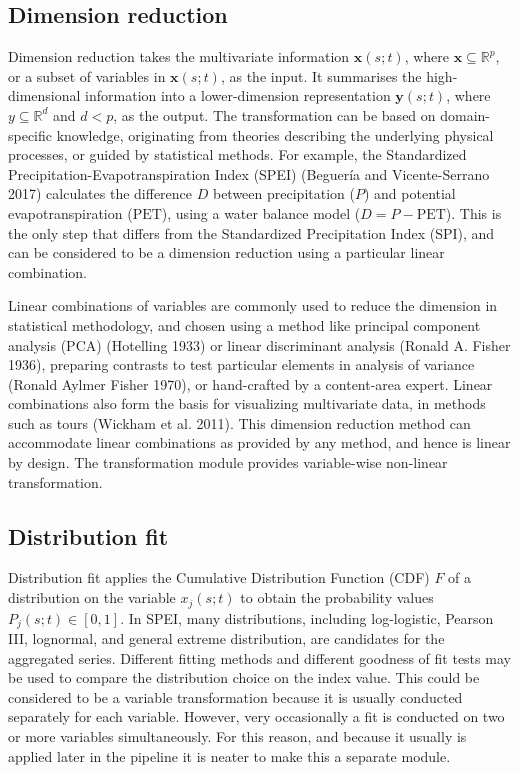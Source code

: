\documentclass[
]{interact}
\begin{document}
\hypertarget{dimension-reduction}{%
\subsection{Dimension reduction}\label{dimension-reduction}}

Dimension reduction takes the multivariate information
\(\mathbf{x}(s;t)\), where \(\mathbf{x} \subseteq \mathbb{R}^p\), or a
subset of variables in \(\mathbf{x}(s;t)\), as the input. It summarises
the high-dimensional information into a lower-dimension representation
\(\mathbf{y}(s;t)\), where \(y \subseteq \mathbb{R}^d\) and \(d < p\),
as the output. The transformation can be based on domain-specific
knowledge, originating from theories describing the underlying physical
processes, or guided by statistical methods. For example, the
Standardized Precipitation-Evapotranspiration Index (SPEI) (Beguería and
Vicente-Serrano 2017) calculates the difference \(D\) between
precipitation (\(P\)) and potential evapotranspiration (\(\text{PET}\)),
using a water balance model (\(D = P - \text{PET}\)). This is the only
step that differs from the Standardized Precipitation Index (SPI), and
can be considered to be a dimension reduction using a particular linear
combination.

Linear combinations of variables are commonly used to reduce the
dimension in statistical methodology, and chosen using a method like
principal component analysis (PCA) (Hotelling 1933) or linear
discriminant analysis (Ronald A. Fisher 1936), preparing contrasts to
test particular elements in analysis of variance (Ronald Aylmer Fisher
1970), or hand-crafted by a content-area expert. Linear combinations
also form the basis for visualizing multivariate data, in methods such
as tours (Wickham et al. 2011). This dimension reduction method can
accommodate linear combinations as provided by any method, and hence is
linear by design. The transformation module provides variable-wise
non-linear transformation.

\hypertarget{distribution-fit}{%
\subsection{Distribution fit}\label{distribution-fit}}

Distribution fit applies the Cumulative Distribution Function (CDF)
\(F\) of a distribution on the variable \(x_j(s; t)\) to obtain the
probability values \(P_j(s;t) \in [0, 1]\). In SPEI, many distributions,
including log-logistic, Pearson III, lognormal, and general extreme
distribution, are candidates for the aggregated series. Different
fitting methods and different goodness of fit tests may be used to
compare the distribution choice on the index value. This could be
considered to be a variable transformation because it is usually
conducted separately for each variable. However, very occasionally a fit
is conducted on two or more variables simultaneously. For this reason,
and because it usually is applied later in the pipeline it is neater to
make this a separate module.
\end{document}
